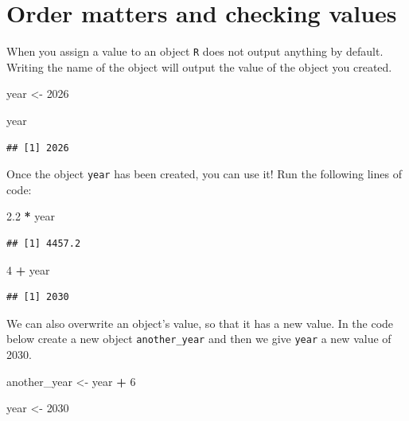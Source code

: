 \documentclass[
  10pt,
  letterpaper,
  twoside,
  openright]{book}
\newenvironment{Shaded}{\begin{snugshade}}{\end{snugshade}}
\newcommand{\DecValTok}[1]{\textcolor[rgb]{0.00,0.00,0.81}{#1}}
\newcommand{\FloatTok}[1]{\textcolor[rgb]{0.00,0.00,0.81}{#1}}
\newcommand{\NormalTok}[1]{#1}
\newcommand{\OtherTok}[1]{\textcolor[rgb]{0.56,0.35,0.01}{#1}}
\newcommand{\SpecialCharTok}[1]{\textcolor[rgb]{0.81,0.36,0.00}{\textbf{#1}}}
\begin{document}
\hypertarget{order-matters-and-checking-values}{%
\section{Order matters and checking
values}\label{order-matters-and-checking-values}}

When you assign a value to an object \texttt{R} does not output anything
by default. Writing the name of the object will output the value of the
object you created.

\begin{Shaded}
\begin{Highlighting}[]
\NormalTok{year }\OtherTok{\textless{}{-}} \DecValTok{2026}

\NormalTok{year}
\end{Highlighting}
\end{Shaded}

\begin{verbatim}
## [1] 2026
\end{verbatim}

Once the object \texttt{year} has been created, you can use it! Run the
following lines of code:

\begin{Shaded}
\begin{Highlighting}[]
\FloatTok{2.2} \SpecialCharTok{*}\NormalTok{ year}
\end{Highlighting}
\end{Shaded}

\begin{verbatim}
## [1] 4457.2
\end{verbatim}

\begin{Shaded}
\begin{Highlighting}[]
\DecValTok{4} \SpecialCharTok{+}\NormalTok{ year }
\end{Highlighting}
\end{Shaded}

\begin{verbatim}
## [1] 2030
\end{verbatim}

We can also overwrite an object's value, so that it has a new value. In
the code below create a new object \texttt{another\_year} and then we
give \texttt{year} a new value of 2030.

\begin{Shaded}
\begin{Highlighting}[]
\NormalTok{another\_year }\OtherTok{\textless{}{-}}\NormalTok{  year }\SpecialCharTok{+} \DecValTok{6}

\NormalTok{year }\OtherTok{\textless{}{-}} \DecValTok{2030} 
\end{Highlighting}
\end{Shaded}
\end{document}
